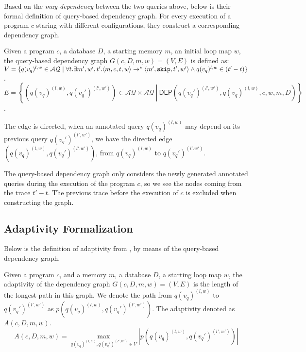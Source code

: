 %
Based on the \emph{may-dependency} between the two queries above,
below is their formal definition of query-based dependency graph. 
For every execution of a program $c$ staring with different configurations, 
they construct a corresponding dependency graph.  
\begin{defn}
Given a program $c$, a database $D$, a starting memory $m$, an initial loop map $w$, the query-based dependency graph $G(c,D,m,w) = (V, E)$ is defined as: \\
$V =\{q({v_q})^{l,w} \in \mathcal{AQ} \mid \forall t. \exists m',  w', t'.  \langle m ,c, t, w \rangle  \to^{*}  \langle m' , \mathtt{skip}, t', w'  \rangle  \land q({v_q})^{l,w} \in {(t'-t)}  \}$.
\\
$E = \left\{(q({v_q})^{(l,w)},q({v_q}')^{(l',w')}) \in \mathcal{AQ} \times \mathcal{AQ} 
~ \left \vert ~ \mathsf{DEP}(q({v_q}')^{(l',w')},q({v_q})^{(l,w)}, c,w,m,D)
 \right.\right\}$.
\end{defn}
%
The edge is directed, when an annotated query $q({v_q})^{(l,w)}$ may depend on its previous query $q({v_q}')^{(l',w')}$, we have the directed
edge $(q({v_q})^{(l,w)}, q({v_q}')^{(l'.w')})$, from $q({v_q})^{(l,w)} $ to $q({v_q}')^{(l'.w')}$.

The query-based dependency graph only considers the newly generated annotated queries during the execution of the program $c$,
so we see the nodes coming from the trace $t'-t$.
The previous trace before the execution of $c$ is excluded when constructing the graph.

\subsection*{Adaptivity Formalization}
Below is the definition of adaptivity from , by means of the query-based dependency graph. 
\begin{defn}
Given a program $c$, and a memory $m$, a database $D$, a starting loop map $w$, the adaptivity of the dependency graph $G(c, D,m,w) = (V, E)$ is the length of the longest path in this graph. We denote the path from $q({v_q})^{(l,w)}$ to $q({v_q}')^{(l',w')}$ as $p(q({v_q})^{(l,w)}, q({v_q}')^{(l',w')} )$. The adaptivity denoted as $A(c, D, m, w)$.
%
$$A(c, D, m, w) = \max\limits_{q({v_q})^{(l,w)},q({v_q}')^{(l',w')} \in V } |p(q({v_q})^{(l,w)}, q({v_q}')^{(l',w')} )| $$
\end{defn}
